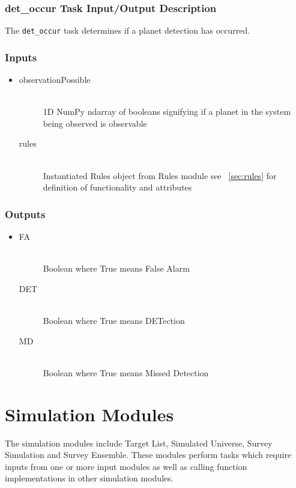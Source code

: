 \documentclass[cleanfoot]{asme2ej}
\begin{document}
\subsubsection{det\_occur Task Input/Output Description} \label{sec:detoccurtask}
The \verb+det_occur+ task determines if a planet detection has occurred.

\subsubsection*{Inputs}
\begin{itemize}
    \item 
    \begin{description}
        \item[observationPossible] \hfill \\
        1D NumPy ndarray of booleans signifying if a planet in the system being observed is observable
        \item[rules] \hfill \\
        Instantiated Rules object from Rules module see ~\ref{sec:rules} for definition of functionality and attributes
    \end{description}
\end{itemize}

\subsubsection*{Outputs}
\begin{itemize}
    \item 
    \begin{description}
        \item[FA] \hfill \\
        Boolean where True means False Alarm
        \item[DET] \hfill \\
        Boolean where True means DETection
        \item[MD] \hfill \\
        Boolean where True means Missed Detection
    \end{description}
\end{itemize}


\section{Simulation Modules}
The simulation modules include Target List, Simulated Universe, Survey Simulation and Survey Ensemble. These modules perform tasks which require inputs from one or more input modules as well as calling function implementations in other simulation modules.
\end{document}
